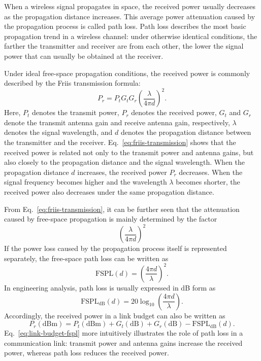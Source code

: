 
When a wireless signal propagates in space,
the received power usually decreases as the propagation distance increases.
This average power attenuation caused by the propagation process is called path loss.
Path loss describes the most basic propagation trend in a wireless channel:
under otherwise identical conditions,
the farther the transmitter and receiver are from each other,
the lower the signal power that can usually be obtained at the receiver.

Under ideal free-space propagation conditions,
the received power is commonly described by the Friis transmission formula:
\begin{equation}
    P_r
    =
    P_t G_t G_r
    \left(
        \frac{\lambda}{4\pi d}
    \right)^2 .
    \label{eq:friis-transmission}
\end{equation}
Here,
\(P_t\) denotes the transmit power,
\(P_r\) denotes the received power,
\(G_t\) and \(G_r\) denote the transmit antenna gain and receive antenna gain,
respectively,
\(\lambda\) denotes the signal wavelength,
and \(d\) denotes the propagation distance between the transmitter and the receiver.
Eq.~\eqref{eq:friis-transmission} shows that the received power is related not only to the transmit power and antenna gains,
but also closely to the propagation distance and the signal wavelength.
When the propagation distance \(d\) increases,
the received power \(P_r\) decreases.
When the signal frequency becomes higher and the wavelength \(\lambda\) becomes shorter,
the received power also decreases under the same propagation distance.

From Eq.~\eqref{eq:friis-transmission},
it can be further seen that the attenuation caused by free-space propagation is mainly determined by the factor
\[
    \left(
        \frac{\lambda}{4\pi d}
    \right)^2
\]
If the power loss caused by the propagation process itself is represented separately,
the free-space path loss can be written as
\begin{equation}
    \mathrm{FSPL}(d)
    =
    \left(
        \frac{4\pi d}{\lambda}
    \right)^2 .
    \label{eq:free-space-path-loss-linear}
\end{equation}
In engineering analysis,
path loss is usually expressed in dB form as
\begin{equation}
    \mathrm{FSPL}_{\mathrm{dB}}(d)
    =
    20\log_{10}
    \left(
        \frac{4\pi d}{\lambda}
    \right).
    \label{eq:free-space-path-loss-db}
\end{equation}
Accordingly,
the received power in a link budget can also be written as
\begin{equation}
    P_r(\mathrm{dBm})
    =
    P_t(\mathrm{dBm})
    +
    G_t(\mathrm{dB})
    +
    G_r(\mathrm{dB})
    -
    \mathrm{FSPL}_{\mathrm{dB}}(d).
    \label{eq:link-budget-fspl}
\end{equation}
Eq.~\eqref{eq:link-budget-fspl} more intuitively illustrates the role of path loss
in a communication link:
transmit power and antenna gains increase the received power,
whereas path loss reduces the received power.

